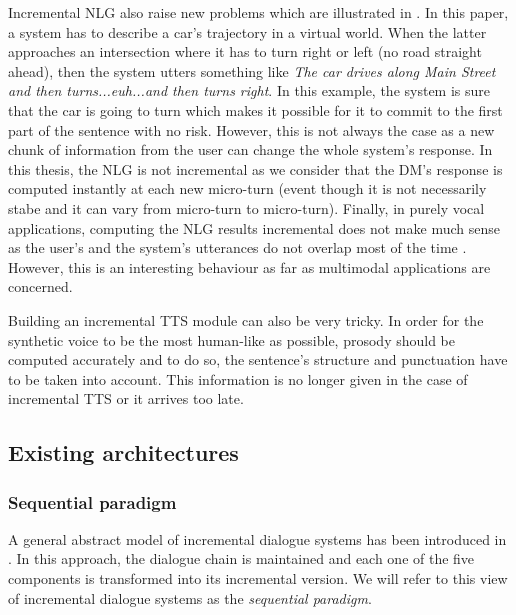                 Incremental NLG also raise new problems which are illustrated in \cite{Baumann2013}. In this paper, a system has to describe a car's trajectory in a virtual world. When the latter approaches an intersection where it has to turn right or left (no road straight ahead), then the system utters something like \textit{The car drives along Main Street and then turns...euh...and then turns right}. In this example, the system is sure that the car is going to turn which makes it possible for it to commit to the first part of the sentence with no risk. However, this is not always the case as a new chunk of information from the user can change the whole system's response. In this thesis, the NLG is not incremental as we consider that the DM's response is computed instantly at each new micro-turn (event though it is not necessarily stabe and it can vary from micro-turn to micro-turn). Finally, in purely vocal applications, computing the NLG results incremental does not make much sense as the user's and the system's utterances do not overlap most of the time \cite{Sacks1974}. However, this is an interesting behaviour as far as multimodal applications are concerned.

                Building an incremental TTS module can also be very tricky. In order for the synthetic voice to be the most human-like as possible, prosody should be computed accurately and to do so, the sentence's structure and punctuation have to be taken into account. This information is no longer given in the case of incremental TTS or it arrives too late.
		

    \subsection{Existing architectures}
    	\subsubsection{Sequential paradigm}
        
            A general abstract model of incremental dialogue systems has been introduced in \cite{Schlangen2011}. In this approach, the dialogue chain is maintained and each one of the five components is transformed into its incremental version. We will refer to this view of incremental dialogue systems as the \textit{sequential paradigm}.
            
